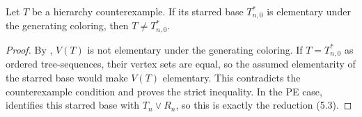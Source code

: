 \begin{lemma}
Let $T$ be a hierarchy counterexample.  If its starred base
$T_{n,0}^{*}$ is elementary under the generating coloring, then
$T\ne T_{n,0}^{*}$.
\end{lemma}
\begin{proof}
By , $V(T)$ is not elementary under the
generating coloring.  If $T=T_{n,0}^{*}$ as ordered tree-sequences, their
vertex sets are equal, so the assumed elementarity of the starred base
would make $V(T)$ elementary.  This contradicts the counterexample
condition and proves the strict inequality.  In the PE case,
 identifies this starred base with
$T_n\vee R_n$, so this is exactly the reduction (5.3).
\end{proof}
